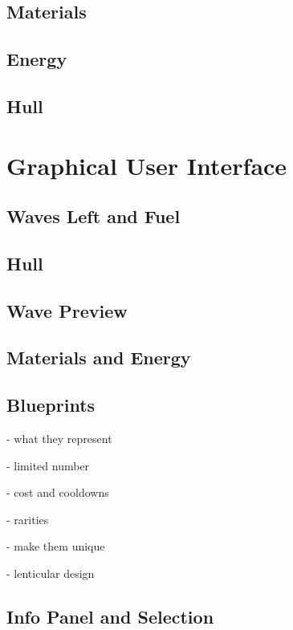 \subsection{Materials}

\subsection{Energy}

\subsection{Hull}

\section{Graphical User Interface}


\subsection{Waves Left and Fuel}

\subsection{Hull}

\subsection{Wave Preview}

\subsection{Materials and Energy}

\subsection{Blueprints}

- what they represent

- limited number

- cost and cooldowns

- rarities

- make them unique

- lenticular design

\subsection{Info Panel and Selection}

